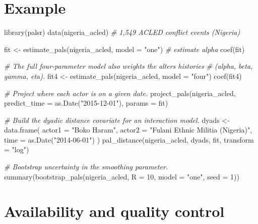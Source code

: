 \documentclass[10pt,a4paper,onecolumn]{article}
\newenvironment{Shaded}{}{}
\newcommand{\AttributeTok}[1]{\textcolor[rgb]{0.49,0.56,0.16}{#1}}
\newcommand{\CommentTok}[1]{\textcolor[rgb]{0.38,0.63,0.69}{\textit{#1}}}
\newcommand{\DecValTok}[1]{\textcolor[rgb]{0.25,0.63,0.44}{#1}}
\newcommand{\FunctionTok}[1]{\textcolor[rgb]{0.02,0.16,0.49}{#1}}
\newcommand{\NormalTok}[1]{#1}
\newcommand{\OtherTok}[1]{\textcolor[rgb]{0.00,0.44,0.13}{#1}}
\newcommand{\StringTok}[1]{\textcolor[rgb]{0.25,0.44,0.63}{#1}}
\begin{document}
\section{Example}\label{example}

\begin{Shaded}
\begin{Highlighting}[]
\FunctionTok{library}\NormalTok{(palsr)}
\FunctionTok{data}\NormalTok{(nigeria\_acled)   }\CommentTok{\# 1,549 ACLED conflict events (Nigeria)}

\NormalTok{fit }\OtherTok{\textless{}{-}} \FunctionTok{estimate\_pals}\NormalTok{(nigeria\_acled, }\AttributeTok{model =} \StringTok{"one"}\NormalTok{)   }\CommentTok{\# estimate alpha}
\FunctionTok{coef}\NormalTok{(fit)}

\CommentTok{\# The full four{-}parameter model also weights the alters\textquotesingle{} histories}
\CommentTok{\# (alpha, beta, gamma, eta).}
\NormalTok{fit4 }\OtherTok{\textless{}{-}} \FunctionTok{estimate\_pals}\NormalTok{(nigeria\_acled, }\AttributeTok{model =} \StringTok{"four"}\NormalTok{)}
\FunctionTok{coef}\NormalTok{(fit4)}

\CommentTok{\# Project where each actor is on a given date.}
\FunctionTok{project\_pals}\NormalTok{(nigeria\_acled,}
             \AttributeTok{predict\_time =} \FunctionTok{as.Date}\NormalTok{(}\StringTok{"2015{-}12{-}01"}\NormalTok{),}
             \AttributeTok{params =}\NormalTok{ fit)}

\CommentTok{\# Build the dyadic distance covariate for an interaction model.}
\NormalTok{dyads }\OtherTok{\textless{}{-}} \FunctionTok{data.frame}\NormalTok{(}
  \AttributeTok{actor1 =} \StringTok{"Boko Haram"}\NormalTok{,}
  \AttributeTok{actor2 =} \StringTok{"Fulani Ethnic Militia (Nigeria)"}\NormalTok{,}
  \AttributeTok{time   =} \FunctionTok{as.Date}\NormalTok{(}\StringTok{"2014{-}06{-}01"}\NormalTok{)}
\NormalTok{)}
\FunctionTok{pal\_distance}\NormalTok{(nigeria\_acled, dyads, fit, }\AttributeTok{transform =} \StringTok{"log"}\NormalTok{)}

\CommentTok{\# Bootstrap uncertainty in the smoothing parameter.}
\FunctionTok{summary}\NormalTok{(}\FunctionTok{bootstrap\_pals}\NormalTok{(nigeria\_acled, }\AttributeTok{R =} \DecValTok{10}\NormalTok{, }\AttributeTok{model =} \StringTok{"one"}\NormalTok{, }\AttributeTok{seed =} \DecValTok{1}\NormalTok{))}
\end{Highlighting}
\end{Shaded}

\section{Availability and quality
control}\label{availability-and-quality-control}
\end{document}

